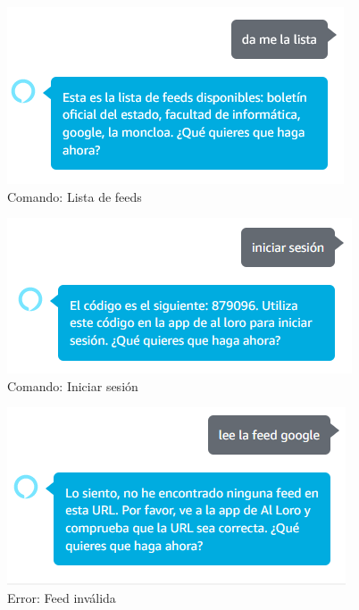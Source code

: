 \documentclass[11pt,spanish,listoffigures,listoftables,table,hyphens,dvipsnames]{tfgetsinf}
\begin{document}
\begin{figure}[ht]
   \centering
   \includegraphics[width=.9\textwidth]{lista-feeds.png}
   \caption{Comando: Lista de feeds}
   \label{figura:comando-lista-feeds}
\end{figure}

\begin{figure}[ht]
   \centering
   \includegraphics[width=.9\textwidth]{iniciar-sesion.png}
   \caption{Comando: Iniciar sesión}
   \label{figura:comando-iniciar-sesion}
\end{figure}

\begin{figure}[ht]
   \centering
   \includegraphics[width=.9\textwidth]{feed-invalida.png}
   \caption{Error: Feed inválida}
   \label{figura:error-feed-invalida}
\end{figure}
\end{document}
